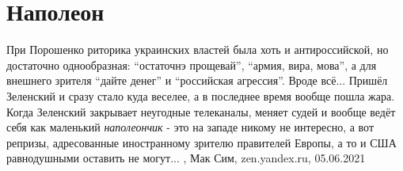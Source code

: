  
 
 
 
 
\chapter{Наполеон}

При Порошенко риторика украинских властей была хоть и антироссийской, но
достаточно однообразная: \enquote{остаточнэ прощевай}, \enquote{армия, вира, мова}, а для
внешнего зрителя \enquote{дайте денег} и \enquote{российская агрессия}. Вроде всё...  Пришёл
Зеленский и сразу стало куда веселее, а в последнее время вообще пошла жара.
Когда Зеленский закрывает неугодные телеканалы, меняет судей и вообще ведёт
себя как маленький \emph{наполеончик} - это на западе никому не интересно, а вот
репризы, адресованные иностранному зрителю правителей Европы, а то и США
равнодушными оставить не могут...
, 
Мак Сим, zen.yandex.ru, 05.06.2021

